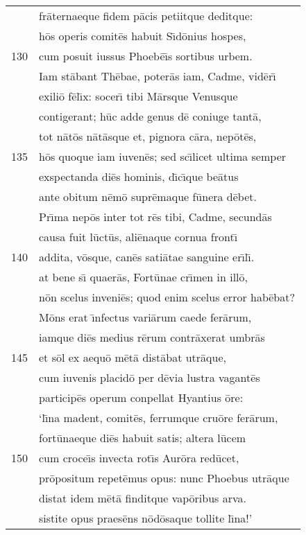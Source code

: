\documentclass[paper=6in:9in,pagesize=pdftex,
               headinclude=on,footinclude=on,12pt]{scrbook}
\begin{document}
\begin{longtable}[p]{ r l }
 & fr\=aternaeque fidem p\=acis petiitque deditque:\\ 
 & h\=os operis comit\=es habuit S\={\i}d\=onius hospes,\\ 
130 & cum posuit iussus Phoeb\=e\={\i}s sortibus urbem.\\ 
 & \indent Iam st\=abant Th\=ebae, poter\=as iam, Cadme, vid\=er\={\i}\\ 
 & exili\=o f\=el\={\i}x: socer\={\i} tibi M\=arsque Venusque\\ 
 & contigerant; h\=uc adde genus d\=e coniuge tant\=a,\\ 
 & tot n\=at\=os n\=at\=asque et, pignora c\=ara, nep\=ot\=es,\\ 
135 & h\=os quoque iam iuven\=es; sed sc\={\i}licet ultima semper\\ 
 & exspectanda di\=es hominis, d\={\i}c\={\i}que be\=atus\\ 
 & ante obitum n\=em\=o supr\=emaque f\=unera d\=ebet.\\ 
 & \indent Pr\={\i}ma nep\=os inter tot r\=es tibi, Cadme, secund\=as\\ 
 & causa fuit l\=uct\=us, ali\=enaque cornua front\={\i}\\ 
140 & addita, v\=osque, can\=es sati\=atae sanguine er\={\i}l\={\i}.\\ 
 & at bene s\={\i} quaer\=as, Fort\=unae cr\={\i}men in ill\=o,\\ 
 & n\=on scelus inveni\=es; quod enim scelus error hab\=ebat?\\ 
 & \indent M\=ons erat \={\i}nfectus vari\=arum caede fer\=arum,\\ 
 & iamque di\=es medius r\=erum contr\=axerat umbr\=as\\ 
145 & et s\=ol ex aequ\=o m\=et\=a dist\=abat utr\=aque,\\ 
 & cum iuvenis placid\=o per d\=evia lustra vagant\=es\\ 
 & particip\=es operum conpellat Hyantius \=ore:\\ 
 & `l\={\i}na madent, comit\=es, ferrumque cru\=ore fer\=arum,\\ 
 & fort\=unaeque di\=es habuit satis; altera l\=ucem\\ 
150 & cum croce\={\i}s invecta rot\={\i}s Aur\=ora red\=ucet,\\ 
 & pr\=opositum repet\=emus opus: nunc Phoebus utr\=aque\\ 
 & distat idem m\=et\=a finditque vap\=oribus arva.\\ 
 & sistite opus praes\=ens n\=od\=osaque tollite l\={\i}na!'\\ 

\end{longtable}
\end{document}
